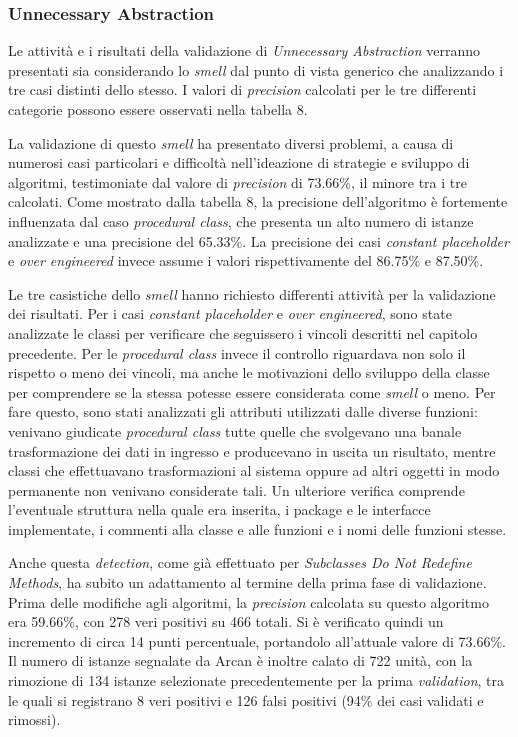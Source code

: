 \subsubsection{Unnecessary Abstraction}
    Le attività e i risultati della validazione di \textit{Unnecessary Abstraction} verranno presentati sia considerando lo \textit{smell} dal punto di vista generico che analizzando i tre casi distinti dello stesso. I valori di \textit{precision} calcolati per le tre differenti categorie possono essere osservati nella tabella 8.
    
    La validazione di questo \textit{smell} ha presentato diversi problemi, a causa di numerosi casi particolari e difficoltà nell'ideazione di strategie e sviluppo di algoritmi, testimoniate dal valore di \textit{precision} di 73.66\%, il minore tra i tre calcolati. Come mostrato dalla tabella 8, la precisione dell'algoritmo è fortemente influenzata dal caso \textit{procedural class}, che presenta un alto numero di istanze analizzate e una precisione del 65.33\%. La precisione dei casi \textit{constant placeholder} e \textit{over engineered} invece assume i valori rispettivamente del 86.75\% e 87.50\%.   

    
    Le tre casistiche dello \textit{smell} hanno richiesto differenti attività per la validazione dei risultati.
    Per i casi \textit{constant placeholder} e \textit{over engineered}, sono state analizzate le classi per verificare che seguissero i vincoli descritti nel capitolo precedente. Per le \textit{procedural class} invece il controllo riguardava non solo il rispetto o meno dei vincoli, ma anche le motivazioni dello sviluppo della classe per comprendere se la stessa potesse essere considerata come \textit{smell} o meno. Per fare questo, sono stati analizzati gli attributi utilizzati dalle diverse funzioni: venivano giudicate \textit{procedural class} tutte quelle che svolgevano una banale trasformazione dei dati in ingresso e producevano in uscita un risultato, mentre classi che effettuavano trasformazioni al sistema oppure ad altri oggetti in modo permanente non venivano considerate tali. Un ulteriore verifica comprende l'eventuale struttura nella quale era inserita, i package e le interfacce implementate, i commenti alla classe e alle funzioni e i nomi delle funzioni stesse. 

    
    Anche questa \textit{detection}, come già effettuato per \textit{Subclasses Do Not Redefine Methods}, ha subito un adattamento al termine della prima fase di validazione. Prima delle modifiche agli algoritmi, la \textit{precision} calcolata su questo algoritmo era 59.66\%, con 278 veri positivi su 466 totali. Si è verificato quindi un incremento di circa 14 punti percentuale, portandolo all'attuale valore di 73.66\%. 
    Il numero di istanze segnalate da Arcan è inoltre calato di 722 unità, con la rimozione di 134 istanze selezionate precedentemente per la prima \textit{validation}, tra le quali si registrano 8 veri positivi e 126 falsi positivi (94\% dei casi validati e rimossi). 
    
